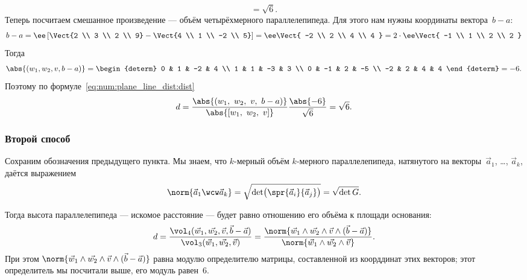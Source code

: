 \begin{solution}
\[{			}
			=
			\sqrt{6}
			.
		\]
		Теперь посчитаем смешанное произведение --- объём четырёхмерного параллелепипеда. Для этого нам нужны координаты вектора~$b-a$:
		\[
			b-a =
			\ee
			\left[ 
				\Vect{2 \\ 3 \\ 2 \\ 9}
				-
				\Vect{4 \\ 1 \\ -2 \\ 5}
			\right]
			=
			\ee
			\Vect{
				-2 \\ 2 \\ 4 \\ 4
			}
			=
			2
			\cdot
			\ee
			\Vect{
				-1 \\ 1 \\ 2 \\ 2
			}
		\]
		Тогда
		\begin{align*}
			\abs{(w_1, w_2, v, b-a)} =
			\begin{determ}
				0 & 1 & -2 & 4 \\
				1 & 1 & -3 & 3 \\
				0 & -1 & 2 & -5 \\
				-2 & 2 & 4 & 4
			\end{determ}
			=
			-6
			.
		\end{align*}
		Поэтому по формуле~\eqref{eq:num:plane_line_dist:dist}
		\[
			d =
			\frac{
				\abs{
					(w_1,\ w_2,\ v,\ b-a)
				}
			}{
				\abs{
					[w_1,\ w_2,\ v]
				}
			}
			\frac{\abs{-6}}{\sqrt{6}}
			=
			\sqrt{6}
			.
		\]

	\subsubsection{Второй способ}
		
		Сохраним обозначения предыдущего пункта. Мы знаем, что $k$-мерный объём $k$-мерного параллелепипеда, натянутого на векторы~$\vec{a}_1$, \dots, $\vec{a}_k$, даётся выражением
		\[
			\norm{
				\vec{a}_1 \wcw \vec{a}_k
			}
			=
			\sqrt{\det\bigl( \spr{\vec{a}_i}{\vec{a}_j} \bigr)}
			=
			\sqrt{\det{G}}
			.
		\]

		Тогда высота параллелепипеда --- искомое расстояние --- будет равно отношению его объёма к площади основания:
		\[
			d =
			\frac{
				\vol_4(
					\vec{w}_1, \vec{w_2}, \vec{v}, \vec{b} - \vec{a}
				)
			}{
				\vol_3(
					\vec{w}_1, \vec{w_2}, \vec{v}
				)
			}
			=
			\frac{
				\norm{
					\vec{w}_1 \wedge
					\vec{w_2} \wedge
					\vec{v}   \wedge
					(\vec{b} - \vec{a})
				}
			}{
				\norm{
					\vec{w}_1 \wedge
					\vec{w_2} \wedge
					\vec{v}
				}
			}
			.
		\]
		При этом
		$
			\norm{
				\vec{w}_1 \wedge
				\vec{w_2} \wedge
				\vec{v}   \wedge
				(\vec{b} - \vec{a})
			}
		$
		равна модулю определителю матрицы, составленной из коорддинат этих векторов; этот определитель мы посчитали выше, его модуль равен~$6$.


\end{solution}
